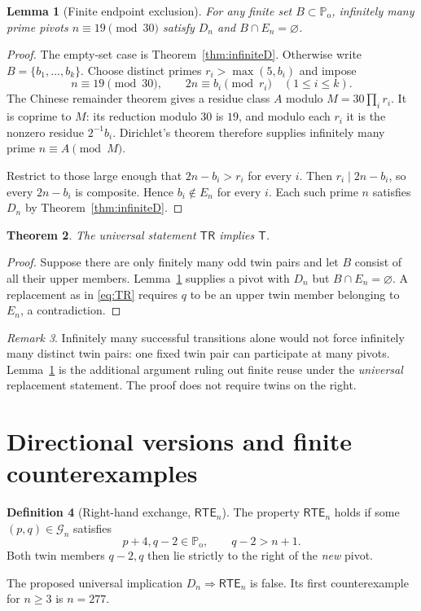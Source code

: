 \documentclass[11pt,a4paper]{article}
\newtheorem{theorem}{Theorem}[section]
\newtheorem{lemma}[theorem]{Lemma}
\theoremstyle{definition}
\newtheorem{definition}[theorem]{Definition}
\theoremstyle{remark}
\newtheorem{remark}[theorem]{Remark}
\newcommand{\Po}{\mathbb P_{\mathrm{o}}}
\newcommand{\G}{\mathcal G}
\newcommand{\TR}{\mathsf{TR}}
\newcommand{\RTE}{\mathsf{RTE}}
\newcommand{\TP}{\mathsf T}
\begin{document}
\begin{lemma}[Finite endpoint exclusion]\label{lem:finite}
For any finite set $B\subset\Po$, infinitely many prime pivots $n\equiv19\pmod{30}$ satisfy $D_n$ and $B\cap E_n=\varnothing$.
\end{lemma}
\begin{proof}
The empty-set case is Theorem~\ref{thm:infiniteD}. Otherwise write $B=\{b_1,\ldots,b_k\}$. Choose distinct primes $r_i>\max(5,b_i)$ and impose
\begin{equation}\label{eq:CRT}
 n\equiv19\pmod{30},\qquad 2n\equiv b_i\pmod{r_i}\quad(1\le i\le k).
\end{equation}
The Chinese remainder theorem gives a residue class $A$ modulo $M=30\prod_i r_i$. It is coprime to $M$: its reduction modulo $30$ is $19$, and modulo each $r_i$ it is the nonzero residue $2^{-1}b_i$. Dirichlet's theorem therefore supplies infinitely many prime $n\equiv A\pmod M$.

Restrict to those large enough that $2n-b_i>r_i$ for every $i$. Then $r_i\mid2n-b_i$, so every $2n-b_i$ is composite. Hence $b_i\notin E_n$ for every $i$. Each such prime $n$ satisfies $D_n$ by Theorem~\ref{thm:infiniteD}.
\end{proof}

\begin{theorem}\label{thm:TRT}
The universal statement $\TR$ implies $\TP$.
\end{theorem}
\begin{proof}
Suppose there are only finitely many odd twin pairs and let $B$ consist of all their upper members. Lemma~\ref{lem:finite} supplies a pivot with $D_n$ but $B\cap E_n=\varnothing$. A replacement as in \eqref{eq:TR} requires $q$ to be an upper twin member belonging to $E_n$, a contradiction.
\end{proof}

\begin{remark}
Infinitely many successful transitions alone would not force infinitely many distinct twin pairs: one fixed twin pair can participate at many pivots. Lemma~\ref{lem:finite} is the additional argument ruling out finite reuse under the \emph{universal} replacement statement. The proof does not require twins on the right.
\end{remark}

\section{Directional versions and finite counterexamples}
\begin{definition}[Right-hand exchange, $\RTE_n$]
The property $\RTE_n$ holds if some $(p,q)\in\G_n$ satisfies
\[
 p+4,q-2\in\Po,\qquad q-2>n+1.
\]
Both twin members $q-2,q$ then lie strictly to the right of the \emph{new} pivot.
\end{definition}
The proposed universal implication $D_n\Rightarrow\RTE_n$ is false. Its first counterexample for $n\ge3$ is $n=277$.
\end{document}
